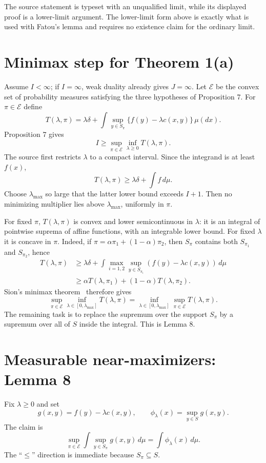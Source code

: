 \begin{remark}
The source statement is typeset with an unqualified limit, while its displayed proof is a
lower-limit argument.  The lower-limit form above is exactly what is used with Fatou's lemma and
requires no existence claim for the ordinary limit.
\end{remark}

\section{Minimax step for Theorem 1(a)}
Assume $I<\infty$; if $I=\infty$, weak duality already gives $J=\infty$.  Let $\mathcal E$ be the
convex set of probability measures satisfying the three hypotheses of Proposition 7.  For
$\pi\in\mathcal E$ define
\[
 T(\lambda,\pi)
 =\lambda\delta+
 \int\sup_{y\in S_\pi}\{f(y)-\lambda c(x,y)\}\,\mu(dx).
\]
Proposition 7 gives
\[
 I\ge\sup_{\pi\in\mathcal E}\inf_{\lambda\ge0}T(\lambda,\pi).
\]
The source first restricts $\lambda$ to a compact interval.  Since the integrand is at least $f(x)$,
\[
 T(\lambda,\pi)\ge\lambda\delta+\int f\,d\mu.
\]
Choose $\lambda_{\max}$ so large that the latter lower bound exceeds $I+1$.  Then no minimizing
multiplier lies above $\lambda_{\max}$, uniformly in $\pi$.

For fixed $\pi$, $T(\lambda,\pi)$ is convex and lower semicontinuous in $\lambda$: it is an integral
of pointwise suprema of affine functions, with an integrable lower bound.  For fixed $\lambda$ it is
concave in $\pi$.  Indeed, if $\pi=\alpha\pi_1+(1-\alpha)\pi_2$, then
$S_\pi$ contains both $S_{\pi_1}$ and $S_{\pi_2}$, hence
\begin{align*}
 T(\lambda,\pi)
 &\ge \lambda\delta+
 \int\max_{i=1,2}
 \sup_{y\in S_{\pi_i}}(f(y)-\lambda c(x,y))\,d\mu\\
 &\ge\alpha T(\lambda,\pi_1)+(1-\alpha)T(\lambda,\pi_2).
\end{align*}
Sion's minimax theorem~\cite{Sion1958} therefore gives
\begin{equation}
 \sup_{\pi\in\mathcal E}\inf_{\lambda\in[0,\lambda_{\max}]}T(\lambda,\pi)
 =\inf_{\lambda\in[0,\lambda_{\max}]}
   \sup_{\pi\in\mathcal E}T(\lambda,\pi). \tag{36}
\end{equation}
The remaining task is to replace the supremum over the support $S_\pi$ by a supremum over all of
$S$ inside the integral.  This is Lemma 8.

\section{Measurable near-maximizers: Lemma 8}
Fix $\lambda\ge0$ and set
\[
 g(x,y)=f(y)-\lambda c(x,y),
 \qquad \phi_\lambda(x)=\sup_{y\in S}g(x,y).
\]
The claim is
\begin{equation}
 \sup_{\pi\in\mathcal E}
 \int\sup_{y\in S_\pi}g(x,y)\,d\mu
 =\int\phi_\lambda(x)\,d\mu. \label{eq:BM-lemma8}
\end{equation}
The ``$\le$'' direction is immediate because $S_\pi\subseteq S$.

